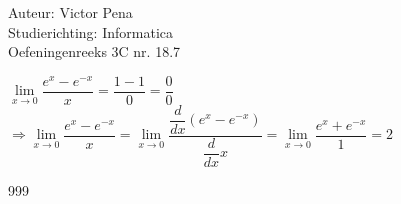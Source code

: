 \documentclass[a4paper]{article}
\newcommand{\dx}{\dfrac{d}{dx}}
\begin{document}
	
	\noindent \large Auteur: Victor Pena \\
	\noindent \large Studierichting: Informatica\\
	\noindent \large Oefeningenreeks 3C nr. 18.7\\
	
	\medskip
	
	\normalsize 
	
	$\lim\limits_{x\to0} \dfrac{e^{x}-e^{-x}}{x} = \dfrac{1-1}{0} = \dfrac{0}{0} $\\
	
	$\Rightarrow \lim\limits_{x\to0} \dfrac{e^{x}-e^{-x}}{x} = \lim\limits_{x\to0} \dfrac{\dx\left(e^{x}-e^{-x}\right)}{\dx x} = \lim\limits_{x\to0}\dfrac{e^x + e^{-x}}{1} = 2 $ \\
	
	
	\begin{thebibliography}{999}
	\end{thebibliography}
\end{document}
